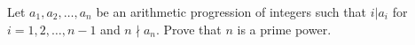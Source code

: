 Let $a_1,a_2 ,\ldots, a_n$ be an arithmetic progression of integers such that $i|a_i$ for $i=1, 2,\ldots ,n-1$ and $n\nmid a_n$. Prove that $n$ is a prime power.